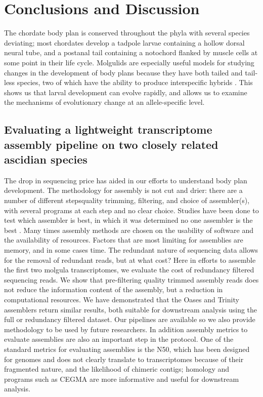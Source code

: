 \chapter{Conclusions and Discussion}
The chordate body plan is conserved throughout the phyla with several species deviating; most chordates develop a tadpole larvae containing a hollow dorsal neural tube, and a postanal tail containing a notochord flanked by muscle cells at some point in their life cycle. %
Molgulids are especially useful models for studying changes in the development of body plans because they have both tailed and tail-less species, two of which have the ability to produce interspecific hybrids \cite{swalla_interspecific_1990}. This shows us that larval development can evolve rapidly, and allows us to examine the mechanisms of evolutionary change at an allele-specific level.

\section{Evaluating a lightweight transcriptome assembly pipeline on two closely related ascidian species}
The drop in sequencing price has aided in our efforts to understand body plan development. %
The methodology for assembly is not cut and drier: there are a number of different steps\textemdash quality trimming, filtering, and choice of assembler(s), with several programs at each step and no clear choice. Studies have been done to test which assembler is best, in which it was determined no one assembler is the best \cite{clarke_comparative_2013}. Many times assembly methods are chosen on the usability of software and the availability of resources. Factors that are most limiting for assemblies are memory, and in some cases time. The redundant nature of sequencing data allows for the removal of redundant reads, but at what cost? Here in efforts to assemble the first two molgula transcriptomes, we evaluate the cost of redundancy filtered sequencing reads. We show that pre-filtering quality trimmed assembly reads does not reduce the information content of the assembly, but a reduction in computational resources. We have demonstrated that the Oases and Trinity assemblers return similar results, both suitable for downstream analysis using the full or redundancy filtered dataset. Our pipelines are available so we also provide methodology to be used by future researchers. In addition assembly metrics to evaluate assemblies are also an important step in the protocol. One of the standard metrics for evaluating assemblies is the N50, which has been designed for genomes and does not clearly translate to transcriptomes because of their fragmented nature, and the likelihood of chimeric contigs; homology and programs such as CEGMA are more informative and useful for downstream analysis. %
 
